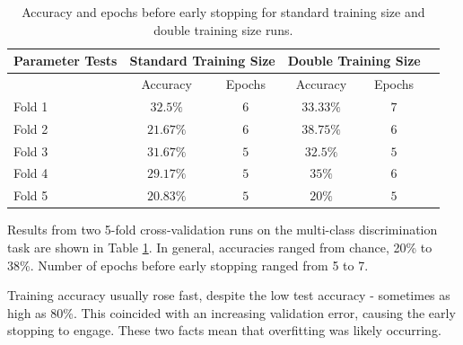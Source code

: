 \documentclass{article}
\begin{document}
\begin{table}[t]
\vskip 0.15in
\begin{center}
\begin{small}
\begin{sc}
\begin{tabular}{lcc|ccr}
\hline
\abovespace\belowspace
Parameter Tests         & \multicolumn{2}{c}{Standard Training Size} & \multicolumn{2}{c}{Double Training Size}\\
\hline
                        & Accuracy  & Epochs   & Accuracy  & Epochs \\
\hline
\abovespace
Fold 1                  & $32.5\%$  & $6$      & $33.33\%$  & $7$    \\
Fold 2                  & $21.67\%$ & $6$      & $38.75\%$  & $6$   \\
Fold 3                  & $31.67\%$ & $5$      & $32.5\%$   & $5$    \\
Fold 4                  & $29.17\%$ & $5$      & $35\%$     & $6$    \\
Fold 5                  & $20.83\%$ & $5$      & $20\%$     & $5$    \\
\end{tabular}
\end{sc}
\end{small}
\end{center}
\vskip -0.1in
\caption{Accuracy and epochs before early stopping for standard training size and double training size runs.}
\label{multiclass_results}
\end{table}

Results from two 5-fold cross-validation runs on the multi-class discrimination task are shown in
Table \ref{multiclass_results}. In general, accuracies ranged from chance, 20\% to 38\%. Number of epochs before early stopping ranged from 5 to 7.

Training accuracy usually rose fast, despite the low test accuracy - sometimes as high as 80\%.
This coincided with an increasing validation error, causing the early stopping to engage.
These two facts mean that overfitting was likely occurring.
\end{document}
